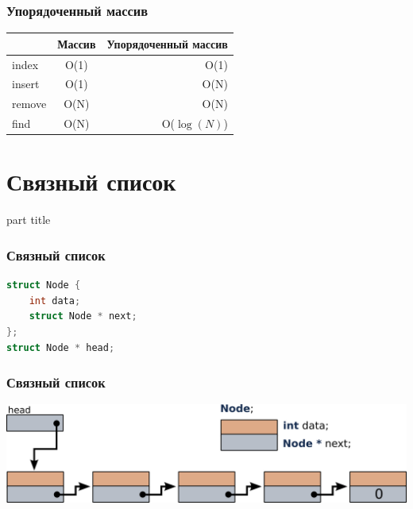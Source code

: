 \documentclass[14pt,pdf,hyperref={unicode}]{beamer}
\begin{document}
\begin{frame}[fragile]
\frametitle{Упорядоченный массив}
\begin{center}
  \begin{tabular}{  l | c r }
      & Массив & Упорядоченный массив \\
    \hline
    index & O(1) & O(1)\\
    insert & O(1) & O(N)\\
    remove & O(N) & O(N)\\
    find & O(N) & O($\log(N)$)\\
    \hline
  \end{tabular}
\end{center}
\end{frame}


\section{Связный список}
\begin{frame}
\begin{center}
\begin{beamercolorbox}[sep=8pt,center]{part
title}
\insertsection
\end{beamercolorbox}
\end{center}
\end{frame}

\begin{frame}[fragile]
\frametitle{Связный список} 
\begin{lstlisting}[language=C++,basicstyle=\ttfamily,keywordstyle=\color{blue},stringstyle=\color{orange}\ttfamily]
struct Node {
	int data;
	struct Node * next;
};
struct Node * head;
\end{lstlisting}
\end{frame}




\begin{frame}[fragile]
\frametitle{Связный список} 
\begin{center}
\includegraphics[width=0.99\linewidth]{images/list_initial.png}
\end{center}
\end{frame}
\end{document}
